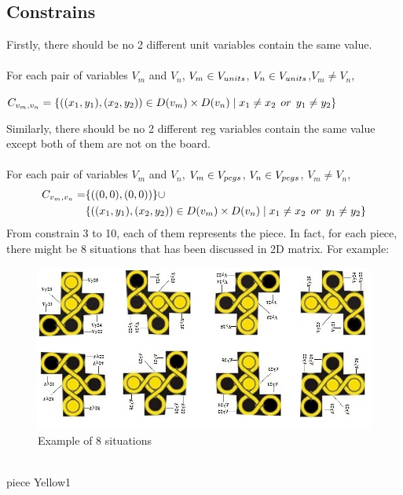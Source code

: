 \subsection{Constrains}
Firstly, there should be no 2 different unit variables contain the same value.\\
\\ 
For each pair of variables $V_{m}$ and $V_{n}$, $V_{m} \in V_{units}$, $V_{n} \in V_{units}$,$V_{m} \neq V_{n}$,
\begin{center}
$C_{v_{m},v_{n}}=\{((x_{1},y_{1}),(x_{2},y_{2}))\in D(v_{m}) \times D(v_{n})\mid x_{1} \neq x_{2}   \hspace{1ex} or \hspace{1ex}  y_{1} \neq y_{2}\}$
\end{center}
Similarly, there should be no 2 different reg variables contain the same value except both of them are not on the board.\\
\\ 
For each pair of variables $V_{m}$ and $V_{n}$, $V_{m} \in V_{pegs}$, $V_{n} \in V_{pegs}$, $V_{m} \neq V_{n}$,
\begin{align*}
C_{v_{m},v_{n}}=&\{((0,0),(0,0))\}\cup \\ 
&\{((x_{1},y_{1}),(x_{2},y_{2}))\in D(v_{m})\times D(v_{n})\mid x_{1} \neq x_{2}   \hspace{1ex} or \hspace{1ex}  y_{1} \neq y_{2}\}
\end{align*}
From constrain 3 to 10, each of them represents the piece. In fact, for each piece, there might be 8 situations that has been discussed in 2D matrix. For example:
\begin{figure}
\centering
\includegraphics[width =\textwidth]{figs/domainexplain.jpg}
    \caption{Example of 8 situations}
    \label{fig:Exampleof8}
\end{figure}
\\ piece Yellow1
